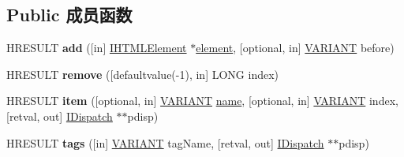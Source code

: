 \subsection*{Public 成员函数}
\begin{DoxyCompactItemize}
\item 
\mbox{\label{interface_m_s_h_t_m_l_1_1_i_h_t_m_l_select_element_a201208306cc4e99e3b738a45ebd4d242}} 
H\+R\+E\+S\+U\+LT {\bfseries add} (\mbox{[}in\mbox{]} \hyperlink{interface_m_s_h_t_m_l_1_1_i_h_t_m_l_element}{I\+H\+T\+M\+L\+Element} $\ast$\hyperlink{structelement}{element}, \mbox{[}optional, in\mbox{]} \hyperlink{structtag_v_a_r_i_a_n_t}{V\+A\+R\+I\+A\+NT} before)
\item 
\mbox{\label{interface_m_s_h_t_m_l_1_1_i_h_t_m_l_select_element_ab440d63f1067e0618348731ac25cd4ca}} 
H\+R\+E\+S\+U\+LT {\bfseries remove} (\mbox{[}defaultvalue(-\/1), in\mbox{]} L\+O\+NG index)
\item 
\mbox{\label{interface_m_s_h_t_m_l_1_1_i_h_t_m_l_select_element_a3f95cf27241c03957736a7fb60a3a0cd}} 
H\+R\+E\+S\+U\+LT {\bfseries item} (\mbox{[}optional, in\mbox{]} \hyperlink{structtag_v_a_r_i_a_n_t}{V\+A\+R\+I\+A\+NT} \hyperlink{structname}{name}, \mbox{[}optional, in\mbox{]} \hyperlink{structtag_v_a_r_i_a_n_t}{V\+A\+R\+I\+A\+NT} index, \mbox{[}retval, out\mbox{]} \hyperlink{interface_i_dispatch}{I\+Dispatch} $\ast$$\ast$pdisp)
\item 
\mbox{\label{interface_m_s_h_t_m_l_1_1_i_h_t_m_l_select_element_a250110458dfd717fc020281a325aa96e}} 
H\+R\+E\+S\+U\+LT {\bfseries tags} (\mbox{[}in\mbox{]} \hyperlink{structtag_v_a_r_i_a_n_t}{V\+A\+R\+I\+A\+NT} tag\+Name, \mbox{[}retval, out\mbox{]} \hyperlink{interface_i_dispatch}{I\+Dispatch} $\ast$$\ast$pdisp)
\end{DoxyCompactItemize}
